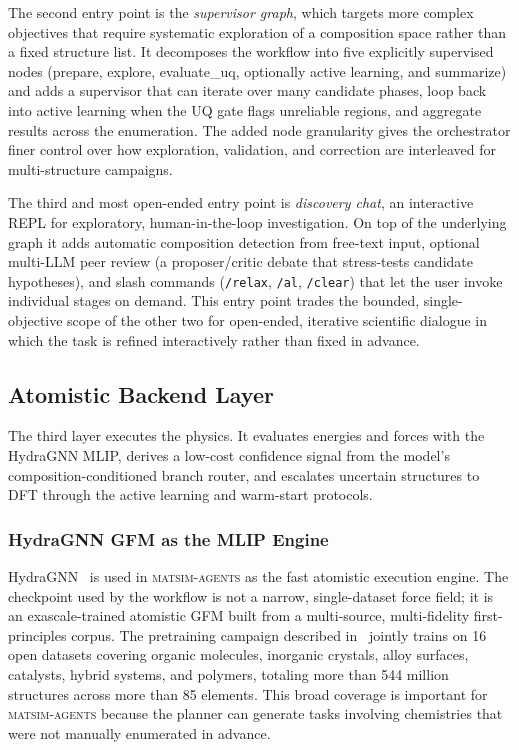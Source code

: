\documentclass[conference]{IEEEtran}
\def\ac#1{#1}%
\def\acs#1{#1}%
\begin{document}
The second entry point is the \emph{supervisor graph}, which targets more
complex objectives that require systematic exploration of a composition space
rather than a fixed structure list. It decomposes the workflow into five
explicitly supervised nodes (prepare, explore, evaluate\_uq, optionally active
learning, and summarize) and adds a supervisor that can iterate over many
candidate phases, loop back into active learning when the \acs{UQ} gate flags
unreliable regions, and aggregate results across the enumeration. The added
node granularity gives the orchestrator finer control over how exploration,
validation, and correction are interleaved for multi-structure campaigns.

The third and most open-ended entry point is \emph{discovery chat}, an
interactive \ac{REPL} for exploratory, human-in-the-loop investigation. On top
of the underlying graph it adds automatic composition detection from
free-text input, optional multi-\acs{LLM} peer review (a proposer/critic debate
that stress-tests candidate hypotheses), and slash commands (\texttt{/relax},
\texttt{/al}, \texttt{/clear}) that let the user invoke individual stages on
demand. This entry point trades the bounded, single-objective scope of the
other two for open-ended, iterative scientific dialogue in which the task is
refined interactively rather than fixed in advance.

\subsection{Atomistic Backend Layer}
The third layer executes the physics. It evaluates energies and forces with the
HydraGNN \acs{MLIP}, derives a low-cost confidence signal from the model's
composition-conditioned branch router, and escalates uncertain structures to
\acs{DFT} through the active learning and warm-start protocols.

\subsubsection{HydraGNN GFM as the MLIP Engine}
HydraGNN~\cite{hydragnn,lupopasini2026exascalegfm} is used in
\textsc{matsim-agents} as the fast atomistic execution engine. The checkpoint
used by the workflow is not a narrow, single-dataset force field; it is an
exascale-trained atomistic \ac{GFM} built from a multi-source,
multi-fidelity first-principles corpus. The pretraining campaign described
in~\cite{lupopasini2026exascalegfm} jointly trains on 16 open datasets
covering organic molecules, inorganic crystals, alloy surfaces, catalysts,
hybrid systems, and polymers, totaling more than 544 million structures across
more than 85 elements. This broad coverage is important for
\textsc{matsim-agents} because the planner can generate tasks involving
chemistries that were not manually enumerated in advance.
\end{document}
